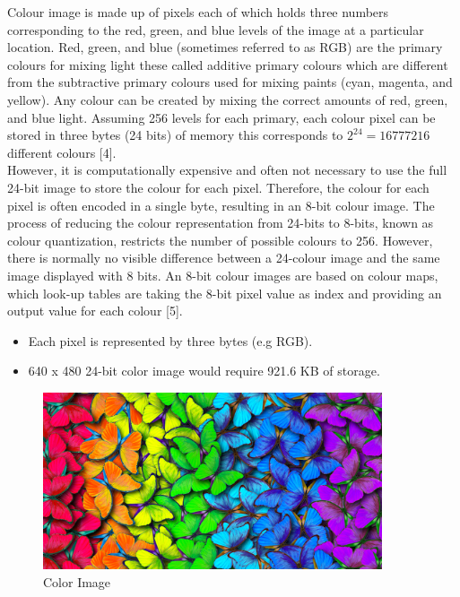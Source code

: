 Colour image is made up of pixels each of which holds three numbers corresponding to the red, green, and blue levels of the
image at a particular location. Red, green, and blue (sometimes referred to as RGB) are the primary colours for mixing
light these called additive primary colours which  are different from the subtractive primary colours used for mixing
paints (cyan, magenta, and yellow). Any colour can be created by mixing the correct amounts of red, green, and blue light.
Assuming 256 levels for each primary, each colour pixel can be stored in three bytes (24 bits) of memory this corresponds to $2^{24}=16777216$ different colours [4].\\
However, it is computationally expensive and often not necessary to use the full 24-bit image to store the colour for each pixel.
Therefore, the colour for each pixel is often encoded in a single byte, resulting in an 8-bit colour image. The process of reducing
the colour representation from 24-bits to 8-bits, known as colour quantization, restricts the number of possible colours to 256.
However, there is normally no visible difference between a 24-colour image and the same image displayed with 8 bits. An 8-bit colour
images are based on colour maps, which look-up tables are taking the 8-bit pixel value as index and providing an output value for each colour [5].

        \begin{itemize}
                \item Each pixel is represented by three bytes (e.g RGB).
                \item 640 x 480 24-bit color image would require 921.6 KB of storage.
        \end{itemize}

        \vspace{4cm}

        \begin{figure}[h]
                \centering
                \includegraphics[width=10cm]{chapiter1/figures/color-image.jpg}
                \setlength{\fboxrule}{2pt}
                \caption{Color Image}
        \end{figure}



